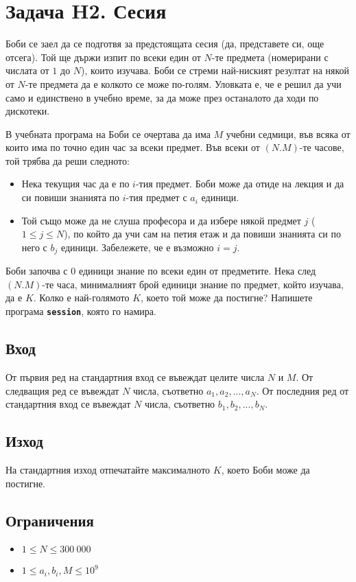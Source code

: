 \documentclass[12pt]{article}
\begin{document}
\section{Задача H2. Сесия}
Боби се заел да се подготвя за предстоящата сесия (да, представете си, още отсега). Той ще държи изпит по всеки един от $N$-те предмета (номерирани с числата от $1$ до $N$), които изучава. Боби се стреми най-ниският резултат на някой от $N$-те предмета да е колкото се може по-голям. Уловката е, че е решил да учи само и единствено в учебно време, за да може през останалото да ходи по дискотеки.

В учебната програма на Боби се очертава да има $M$ учебни седмици, във всяка от които има по точно един час за всеки предмет. Във всеки от $(N.M)$-те часове, той трябва да реши следното:

\begin{itemize}
    \item Нека текущия час да е по $i$-тия предмет. Боби може да отиде на лекция и да си повиши знанията по $i$-тия предмет с $a_i$ единици.
    \item Той също може да не слуша професора и да избере някой предмет $j$ ($1 \leq j \leq N$), по който да учи сам на петия етаж и да повиши знанията си по него с $b_j$ единици. Забележете, че е възможно $i=j$.
\end{itemize}

Боби започва с 0 единици знание по всеки един от предметите. Нека след $(N.M)$-те часа, минималният брой единици знание по предмет, който изучава, да е $K$. Колко е най-голямото $K$, което той може да постигне? Напишете програма \textbf{\texttt{session}}, която го намира.

\subsection{Вход}

От първия ред на стандартния вход се въвеждат целите числа $N$ и $M$. От следващия ред се въвеждат $N$ числа, съответно $a_1,a_2,...,a_N$. От последния ред от стандартния вход се въвеждат $N$ числа, съответно $b_1,b_2,...,b_N$.

\subsection{Изход}
На стандартния изход отпечатайте максималното $K$, което Боби може да постигне.

\subsection{Ограничения}
\begin{itemize}
	\item $1\leq N \leq 300\ 000$
        \item $1\leq a_i, b_i, M \leq 10^9$
\end{itemize}
\end{document}

